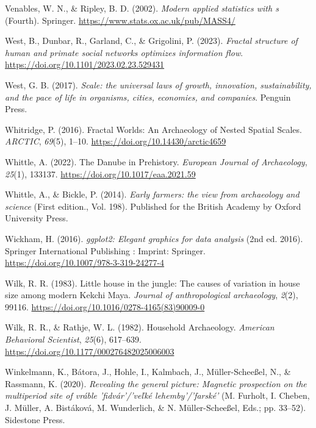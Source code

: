 \documentclass[
  12pt,
]{book}
\newlength{\cslhangindent}
\newlength{\cslentryspacingunit} %
\newenvironment{CSLReferences}[2] %
 {%
  \setlength{\parindent}{0pt}
  \ifodd #1
  \let\oldpar\par
  \def\par{\hangindent=\cslhangindent\oldpar}
  \fi
  \setlength{\parskip}{#2\cslentryspacingunit}
 }%
 {}
\begin{document}
\begin{CSLReferences}{1}{0}
\leavevmode{}%
Venables, W. N., \& Ripley, B. D. (2002). \emph{Modern applied statistics with s} (Fourth). Springer. \url{https://www.stats.ox.ac.uk/pub/MASS4/}

\leavevmode{}%
West, B., Dunbar, R., Garland, C., \& Grigolini, P. (2023). \emph{Fractal structure of human and primate social networks optimizes information flow}. \url{https://doi.org/10.1101/2023.02.23.529431}

\leavevmode{}%
West, G. B. (2017). \emph{Scale: the universal laws of growth, innovation, sustainability, and the pace of life in organisms, cities, economies, and companies}. Penguin Press.

\leavevmode{}%
Whitridge, P. (2016). Fractal Worlds: An Archaeology of Nested Spatial Scales. \emph{ARCTIC}, \emph{69}(5), 1--10. \url{https://doi.org/10.14430/arctic4659}

\leavevmode{}%
Whittle, A. (2022). The Danube in Prehistory. \emph{European Journal of Archaeology}, \emph{25}(1), 133137. \url{https://doi.org/10.1017/eaa.2021.59}

\leavevmode{}%
Whittle, A., \& Bickle, P. (2014). \emph{Early farmers: the view from archaeology and science} (First edition., Vol. 198). Published for the British Academy by Oxford University Press.

\leavevmode{}%
Wickham, H. (2016). \emph{ggplot2: Elegant graphics for data analysis} (2nd ed. 2016). Springer International Publishing : Imprint: Springer. \url{https://doi.org/10.1007/978-3-319-24277-4}

\leavevmode{}%
Wilk, R. R. (1983). Little house in the jungle: The causes of variation in house size among modern Kekchi Maya. \emph{Journal of anthropological archaeology}, \emph{2}(2), 99116. \url{https://doi.org/10.1016/0278-4165(83)90009-0}

\leavevmode{}%
Wilk, R. R., \& Rathje, W. L. (1982). Household Archaeology. \emph{American Behavioral Scientist}, \emph{25}(6), 617--639. \url{https://doi.org/10.1177/000276482025006003}

\leavevmode{}%
Winkelmann, K., Bátora, J., Hohle, I., Kalmbach, J., Müller-Scheeßel, N., \& Rassmann, K. (2020). \emph{Revealing the general picture: Magnetic prospection on the multiperiod site of vráble 'fidvár'/'ve{ľ}ké lehemby'/'farské'} (M. Furholt, I. Cheben, J. Müller, A. Bistáková, M. Wunderlich, \& N. Müller-Scheeßel, Eds.; pp. 33--52). Sidestone Press.


\end{CSLReferences}
\end{document}
